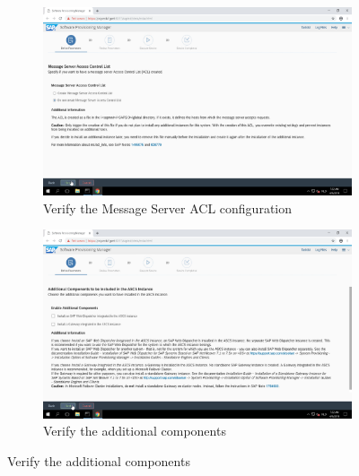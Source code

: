 \begin{figure}[!htb]\ContinuedFloat
    \begin{subfigure}{0.5\textwidth}
        \captionsetup{width=0.8\linewidth}
        \includegraphics[width=0.9\linewidth]{img/Methodologie/SAP10.png}
        \centering
        \caption{Verify the Message Server ACL configuration}
    \end{subfigure}
    \begin{subfigure}{0.5\textwidth}
        \captionsetup{width=0.8\linewidth}
        \includegraphics[width=0.9\linewidth]{img/Methodologie/SAP09.png} 
        \centering
        \caption{Verify the additional components}
    \end{subfigure}
\end{figure}
